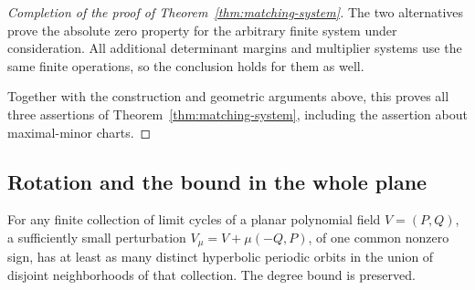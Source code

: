 \begin{proof}[Completion of the proof of Theorem~\ref{thm:matching-system}]
The two alternatives prove the absolute zero property for the arbitrary
finite system under consideration.  All additional determinant margins
and multiplier systems use the same finite operations, so the conclusion
holds for them as well.

Together with the construction and geometric arguments above, this
proves all three assertions of Theorem~\ref{thm:matching-system}, including
the assertion about maximal-minor charts.
\end{proof}

\subsection{Rotation and the bound in the whole plane}

\begin{lemma}
\label{lem:counting-rotation}
For any finite collection of limit cycles of a planar polynomial
field $V=(P,Q)$, a sufficiently small perturbation
$V_\mu=V+\mu(-Q,P)$, of one common nonzero sign, has at least as
many distinct hyperbolic periodic orbits in the union of disjoint
neighborhoods of that collection.  The degree bound is preserved.
\end{lemma}

